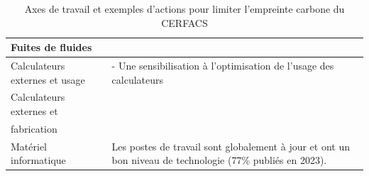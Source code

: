 \begin{table}[H]
\begin{tabular}{|p{}|p{}|}
    \hline
    Fuites de fluides &  \\
    \hline
    Calculateurs externes et usage & 
    - Une sensibilisation à l’optimisation de l’usage des calculateurs \\
    \hline
    Calculateurs externes et \\fabrication &
    \phantom{-}
    \phantom{-}\\
    \hline
    Matériel informatique & 
    Les postes de travail sont globalement à jour et ont un bon niveau de technologie (77\% publiés en 2023). \\
    \hline
    \end{tabular}
    \caption{Axes de travail et exemples d'actions pour limiter l'empreinte carbone du \\ CERFACS}
    \label{tab:Eco_actions}
\end{table}



